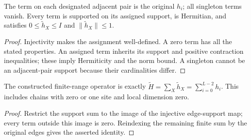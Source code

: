 \begin{lemma}
    \label{thm:huang_positive_chain_terms}
    \leanok
    The term on each designated adjacent pair is the original $h_i$; all
    singleton terms vanish. Every term is supported on its assigned support,
    is Hermitian, and satisfies $0\le\widetilde h_X\le I$ and
    $\|\widetilde h_X\|\le1$.
\end{lemma}
\begin{proof}
    \leanok
    Injectivity makes the assignment well-defined. A zero term has all the
    stated properties. An assigned term inherits its support and positive
    contraction inequalities; these imply Hermiticity and the norm bound.
    A singleton cannot be an adjacent-pair support because their cardinalities
    differ.
\end{proof}

\begin{lemma}
    \label{thm:huang_positive_chain_operator}
    \leanok
    The constructed finite-range operator is exactly
    $\widetilde H=\sum_X\widetilde h_X=\sum_{i=0}^{L-2}h_i$.
    This includes chains with zero or one site and local dimension zero.
\end{lemma}
\begin{proof}
    \leanok
    Restrict the support sum to the image of the injective edge-support map;
    every term outside this image is zero. Reindexing the remaining finite sum
    by the original edges gives the asserted identity.
\end{proof}
